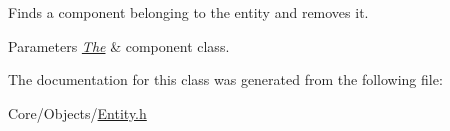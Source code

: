 Finds a component belonging to the entity and removes it. 


\begin{DoxyParams}{Parameters}
{\em \hyperlink{classThe}{The}} & component class. \\
\hline
\end{DoxyParams}


The documentation for this class was generated from the following file\-:\begin{DoxyCompactItemize}
\item 
Core/\-Objects/\hyperlink{Entity_8h}{Entity.\-h}\end{DoxyCompactItemize}
